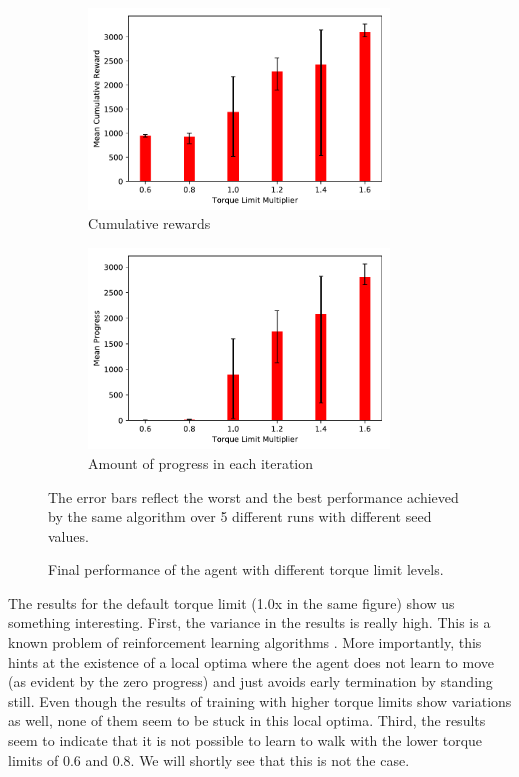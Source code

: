\begin{figure}
    \centering
    \begin{subfigure}[t]{\textwidth}
        \centering
        \includegraphics[width=80mm]{img/TorqueLimit_Reward.pdf}
        \caption{Cumulative rewards}
    \end{subfigure}
    \begin{subfigure}[t]{\textwidth}
        \centering
        \includegraphics[width=80mm]{img/TorqueLimit_Progress.pdf}
        \caption{Amount of progress in each iteration}
    \end{subfigure}
    \caption{Final performance of the agent with different torque limit levels.}{The error bars reflect the worst and the best performance achieved by the same algorithm over 5 different runs with different seed values.}
    \label{fig:torque_limit_base}
\end{figure}

The results for the default torque limit (1.0x in the same figure) show us something interesting. First, the variance in the results is really high. This is a known problem of reinforcement learning algorithms \cite{rl_that_matters}. More importantly, this hints at the existence of a local optima where the agent does not learn to move (as evident by the zero progress) and just avoids early termination by standing still.  Even though the results of training with higher torque limits show variations as well, none of them seem to be stuck in this local optima. Third, the results seem to indicate that it is not possible to learn to walk with the lower torque limits of 0.6 and 0.8. We will shortly see that this is not the case.

